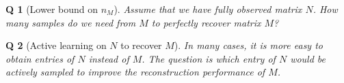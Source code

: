 \documentclass{article} %
\newtheorem{question}{Q}
\begin{document}
\begin{question}[Lower bound on $n_M$]
Assume that we have fully observed matrix $N$. How many samples do we need from $M$ to perfectly recover matrix $M$?
\end{question}

\begin{question}[Active learning on $N$ to recover $M$]
In many cases, it is more easy to obtain entries of $N$ instead of $M$. The question is which entry of $N$ would be actively sampled to improve the reconstruction performance of $M$.
\end{question}





\end{document}
